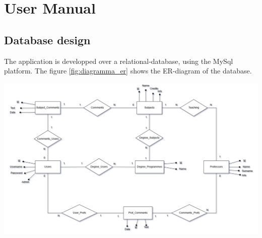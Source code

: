 \documentclass[a4paper, oneside]{article}
\begin{document}
\clearpage
\section{User Manual}





























\iffalse

\clearpage
\subsection{Database design}
The application is developped over a relational-database, using the MySql platform. The figure \ref{fig:diagramma_er} shows the ER-diagram of the database.\\

\begin{minipage}{\linewidth}
\begin{center}
\vspace{1mm}
\includegraphics[width=155mm]{./images/diagrams/er_diagram.png} 
\vspace{2mm}
\label{fig:diagramma_er}
\end{center}
\end{minipage}
\end{document}
